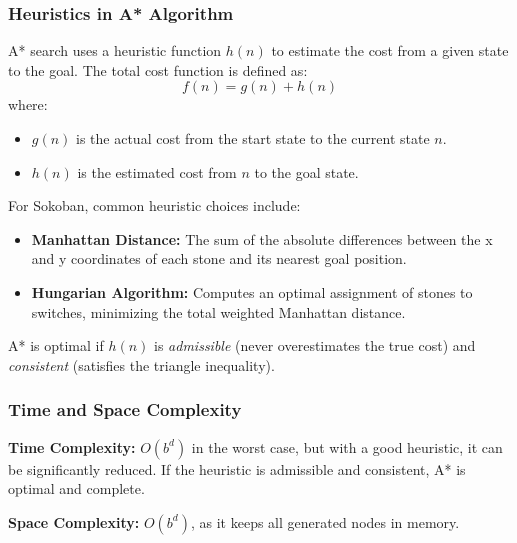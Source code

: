 \subsubsection{Heuristics in A* Algorithm}
A* search uses a heuristic function \( h(n) \) to estimate the cost from a given state to the goal. The total cost function is defined as:
\[
f(n) = g(n) + h(n)
\]
where:
\begin{itemize}
    \item \( g(n) \) is the actual cost from the start state to the current state \( n \).
    \item \( h(n) \) is the estimated cost from \( n \) to the goal state.
\end{itemize}
For Sokoban, common heuristic choices include:
\begin{itemize}
    \item \textbf{Manhattan Distance:} The sum of the absolute differences between the x and y coordinates of each stone and its nearest goal position.
    \item \textbf{Hungarian Algorithm:} Computes an optimal assignment of stones to switches, minimizing the total weighted Manhattan distance.
\end{itemize}
A* is optimal if \( h(n) \) is \textit{admissible} (never overestimates the true cost) and \textit{consistent} (satisfies the triangle inequality).

\subsubsection{Time and Space Complexity}
\textbf{Time Complexity:} \( O(b^d) \) in the worst case, but with a good heuristic, it can be significantly reduced. If the heuristic is admissible and consistent, A* is optimal and complete.

\textbf{Space Complexity:} \( O(b^d) \), as it keeps all generated nodes in memory.
